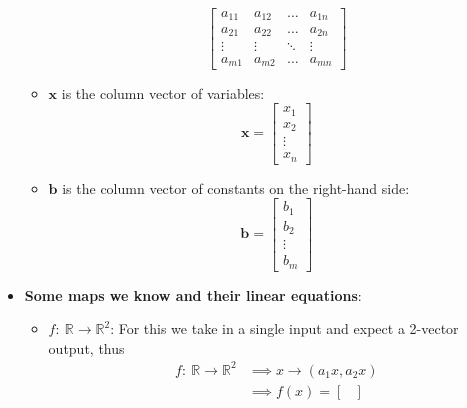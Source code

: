\documentclass{report}
\begin{document}
\begin{itemize}
\begin{itemize}
\[\begin{bmatrix}
                             a_{11} & a_{12} & \dots & a_{1n} \\
                             a_{21} & a_{22} & \dots & a_{2n} \\
                             \vdots & \vdots & \ddots & \vdots \\
                             a_{m1} & a_{m2} & \dots & a_{mn}
                         \end{bmatrix}
                     \]
                 \item \(\mathbf{x}\) is the column vector of variables:
                     \[
                         \mathbf{x} = 
                         \begin{bmatrix}
                             x_1 \\
                             x_2 \\
                             \vdots \\
                             x_n
                         \end{bmatrix}
                     \]
                 \item \(\mathbf{b}\) is the column vector of constants on the right-hand side:
                     \[
                         \mathbf{b} = 
                         \begin{bmatrix}
                             b_1 \\
                             b_2 \\
                             \vdots \\
                             b_m
                         \end{bmatrix}
                     \]
             \end{itemize}
            \item \textbf{Some maps we know and their linear equations}:
                \begin{itemize}
                    \item \textbf{$f:\ \mathbb{R} \to \mathbb{R}^{2}$}: For this we take in a single input and expect a 2-vector output, thus
                        \begin{align*}
                            f:\ \mathbb{R} \to \mathbb{R}^{2} &\implies x \to (a_{1}x, a_{2}x) \\
                                                              &\implies f(x) = 
                                                              \begin{bmatrix}

\end{bmatrix}
\end{align*}
\end{itemize}
\end{itemize}
\end{document}
